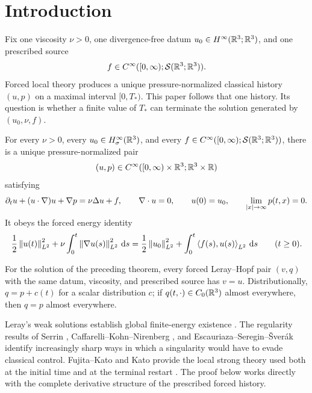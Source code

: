 \section{Introduction}
\label{sec:introduction}

Fix one viscosity \(\nu>0\), one divergence-free datum
\(u_0\in H^\infty(\mathbb R^3;\mathbb R^3)\), and one prescribed source
\[
 f\in C^\infty([0,\infty);\mathcal S(\mathbb R^3;\mathbb R^3)).
\]
Forced local theory produces a unique pressure-normalized classical history
\((u,p)\) on a maximal interval \([0,T_*)\). This paper follows that one
history. Its question is whether a finite value of \(T_*\) can terminate the
solution generated by \((u_0,\nu,f)\).

\begin{maintheorem}
\label{thm:main-global}
For every \(\nu>0\), every \(u_0\in H^\infty_\sigma(\mathbb R^3)\), and every
\(f\in C^\infty([0,\infty);\mathcal S(\mathbb R^3;\mathbb R^3))\), there is a unique
pressure-normalized pair
\[
 (u,p)\in C^\infty([0,\infty)\times\mathbb R^3;\mathbb R^3\times\mathbb R)
\]
satisfying
\[
 \partial_tu+(u\cdot\nabla)u+\nabla p=\nu\Delta u+f,
 \qquad \nabla\cdot u=0,
 \qquad u(0)=u_0,
 \qquad \lim_{\left|x\right|\to\infty}p(t,x)=0.
\]
It obeys the forced energy identity
\[
 \frac12\left\lVert u(t)\right\rVert_{L^2}^2
 +\nu\int_0^t\left\lVert \nabla u(s)\right\rVert_{L^2}^2\,\mathrm d s
 =\frac12\left\lVert u_0\right\rVert_{L^2}^2
 +\int_0^t\left\langle f(s),u(s)\right\rangle_{L^2}\,\mathrm d s
 \qquad(t\ge0).
\]
\end{maintheorem}

\begin{corollary}
\label{cor:main-weak-strong}
For the solution of the preceding theorem, every forced Leray--Hopf pair
\((v,q)\) with the same datum, viscosity, and
prescribed source has \(v=u\). Distributionally,
\(q=p+c(t)\) for a scalar distribution \(c\); if
\(q(t,\cdot)\in C_0(\mathbb R^3)\) almost everywhere, then \(q=p\) almost
everywhere.
\end{corollary}

Leray's weak solutions establish global finite-energy existence
\cite{Leray1934}. The regularity results of Serrin
\cite{Serrin1962}, Caffarelli--Kohn--Nirenberg \cite{CKN1982}, and
Escauriaza--Seregin--\v{S}ver\'ak \cite{ESS2003} identify increasingly sharp
ways in which a singularity would have to evade classical control.
Fujita--Kato and Kato provide the local strong theory used both at the
initial time and at the terminal restart \cite{FujitaKato1964,Kato1984}.
The proof below works directly with the complete derivative structure of the
prescribed forced history.

